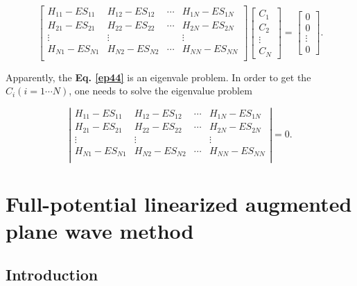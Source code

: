 \documentclass[a4paper, 12pt, titlepage,oneside,drop]{kthesis}
\begin{document}
\begin{equation}\label{ep44}
\left[
\begin{matrix}
    H_{11} - E S_{11} & H_{12} - E S_{12} & \cdots & H_{1N} - E S_{1N} \\
   H_{21} - E S_{21} & H_{22} - E S_{22} & \cdots & H_{2N} - E S_{2N} \\
    \vdots               & \vdots               &        & \vdots               \\
  H_{N1} - E S_{N1} & H_{N2} - E S_{N2} & \cdots & H_{NN} - E S_{NN} \\
\end{matrix} \right] \left[ \begin{array}{c} C_1 \\ C_2 \\ \vdots \\ C_N\end{array} \right]
= \left[ \begin{array}{c} 0 \\ 0 \\ \vdots \\ 0 \end{array} \right].
\end{equation}

Apparently, the \textbf{Eq. \ref{ep44}} is an eigenvale problem. In order to get the $C_{i} (i = 1 \cdots N)$, one needs to solve the eigenvalue problem

\begin{equation}\label{ep4}
\left|
\begin{matrix}
    H_{11} - E S_{11} & H_{12} - E S_{12} & \cdots & H_{1N} - E S_{1N} \\
   H_{21} - E S_{21} & H_{22} - E S_{22} & \cdots & H_{2N} - E S_{2N} \\
    \vdots               & \vdots               &        & \vdots               \\
  H_{N1} - E S_{N1} & H_{N2} - E S_{N2} & \cdots & H_{NN} - E S_{NN} \\
\end{matrix} \right|
 = 0.
\end{equation}

\section{Full-potential linearized augmented plane wave method}
\subsection{Introduction}
\end{document}
